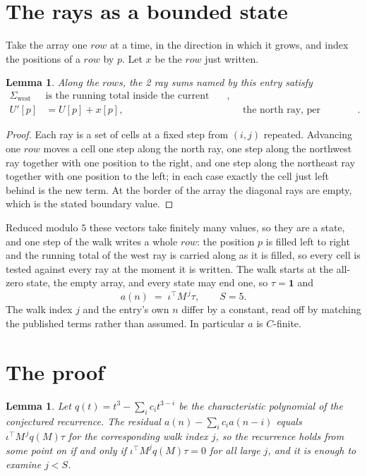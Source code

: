 \documentclass[11pt,a4paper]{article}
\theoremstyle{plain}
\newtheorem{lemma}[theorem]{Lemma}
\theoremstyle{definition}
\begin{document}
\section{The rays as a bounded state}

Take the array one $row$ at a time, in the direction in which it grows, and index the
positions of a $row $ by $p$. Let $x$ be the $row$ just written.

\begin{lemma}\label{lem:rays}
Along the $row$s, the 2 ray sums named by this entry satisfy
\[
\begin{aligned}
\Sigma_{\mathrm{west}}\ &\text{is the running total inside the current row},\\
U'[p]&=U[p]+x[p], &&\text{the north ray, per position} .
\end{aligned}
\]
\end{lemma}

\begin{proof}
Each ray is a set of cells at a fixed step from $(i,j)$ repeated. Advancing one $row$
moves a cell one step along the north ray, one step along the northwest ray together with one
position to the right, and one step along the northeast ray together with one position to the
left; in each case exactly the cell just left behind is the new term. At the border of the
array the diagonal rays are empty, which is the stated boundary value.
\end{proof}

Reduced modulo $5$ these vectors take finitely many values, so they are a state, and one step
of the walk writes a whole $row$: the position $p$ is filled left to right and the
running total of the west ray is carried along as it is filled, so every cell is tested
against every ray at the moment it is written. The walk starts at the all-zero state, the empty
array, and every state may end one, so $\tau=\mathbf{1}$ and
\[
a(n)\;=\;\iota^{\!\top}M^{\,j}\tau ,\qquad S=5.
\]
The walk index $j$ and the entry's own $n$ differ by a constant, read off by matching the
published terms rather than assumed. In particular $a$ is $C$-finite.

\section{The proof}

\begin{lemma}\label{lem:crit}
Let $q(t)=t^{3}-\sum_i c_it^{3-i}$ be the characteristic polynomial of the
conjectured recurrence. The residual $a(n)-\sum_ic_ia(n-i)$ equals
$\iota^{\!\top}M^{\,j}q(M)\tau$ for the corresponding walk index $j$, so the recurrence
holds from some point on if and only if $\iota^{\!\top}M^{j}q(M)\tau=0$ for all large $j$,
and it is enough to examine $j<S$.
\end{lemma}
\end{document}
